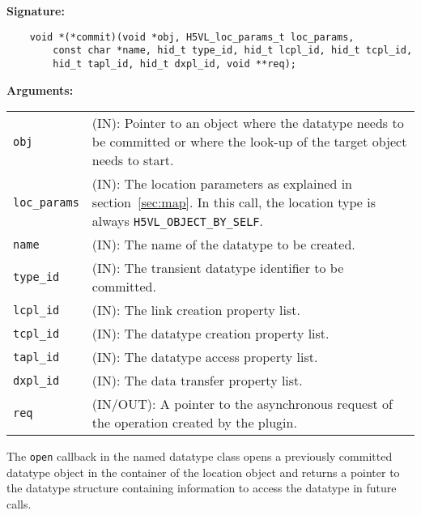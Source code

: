\begin{mdframed}[style=bgbox]
\textbf{Signature:}
\begin{lstlisting}
    void *(*commit)(void *obj, H5VL_loc_params_t loc_params, 
        const char *name, hid_t type_id, hid_t lcpl_id, hid_t tcpl_id, 
        hid_t tapl_id, hid_t dxpl_id, void **req);
\end{lstlisting}

\textbf{Arguments:}\\
\begin{tabular}{l p{10cm}}
  \texttt{obj} & (IN): Pointer to an object where the datatype needs
  to be committed or where the look-up of the target object needs to
  start.\\
  \texttt{loc\_params} & (IN): The location parameters as explained in
  section~\ref{sec:map}. In this call, the location type is always \texttt{H5VL\_OBJECT\_BY\_SELF}. \\
  \texttt{name} & (IN): The name of the datatype to be created.\\
  \texttt{type\_id} & (IN): The transient datatype identifier to be
  committed. \\
  \texttt{lcpl\_id} & (IN): The link creation property list. \\
  \texttt{tcpl\_id} & (IN): The datatype creation property list.\\
  \texttt{tapl\_id} & (IN): The datatype access property list.\\
  \texttt{dxpl\_id} & (IN): The data transfer property list.\\
  \texttt{req} & (IN/OUT): A pointer to the asynchronous request of the
  operation created by the plugin.\\
\end{tabular}
\end{mdframed}

The \texttt{open} callback in the named datatype class opens a
previously committed datatype object in the container of the location
object and returns a pointer to the datatype structure containing
information to access the datatype in future calls.\bigskip

